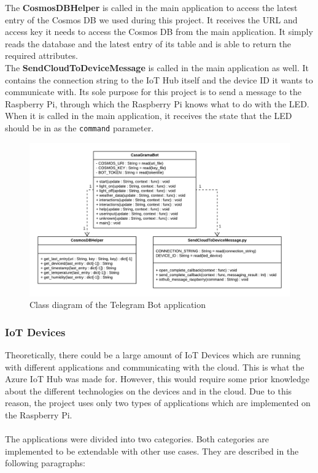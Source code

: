 \documentclass[a4paper]{article}
\begin{document}
			The \textbf{CosmosDBHelper} is called in the main application to access the latest entry of the Cosmos DB we used during this project.
			It receives the URL and access key it needs to access the Cosmos DB from the main application.
			It simply reads the database and the latest entry of its table and is able to return the required attributes.\\
			
			The \textbf{SendCloudToDeviceMessage} is called in the main application as well.
			It contains the connection string to the IoT Hub itself and the device ID it wants to communicate with.
			Its sole purpose for this project is to send a message to the Raspberry Pi, through which the Raspberry Pi knows what to do with the LED.
			When it is called in the main application, it receives the state that the LED should be in as the \texttt{command} parameter.
			
			
			\begin{figure}[!htb]
				\centering
				\includegraphics[width=\textwidth]{img/bot_classdiagram.png}
				\caption{Class diagram of the Telegram Bot application}
				\label{fig:botclassdiagram}
			\end{figure}
		
			\newpage
		
			\subsubsection{IoT Devices}
			Theoretically, there could be a large amount of IoT Devices which are running with different applications and communicating with the cloud.
			This is what the Azure IoT Hub was made for.
			However, this would require some prior knowledge about the different technologies on the devices and in the cloud.
			Due to this reason, the project uses only two types of applications which are implemented on the Raspberry Pi.
			\\
			\\
			The applications were divided into two categories.
			Both categories are implemented to be extendable with other use cases.
			They are described in the following paragraphs:
\end{document}

